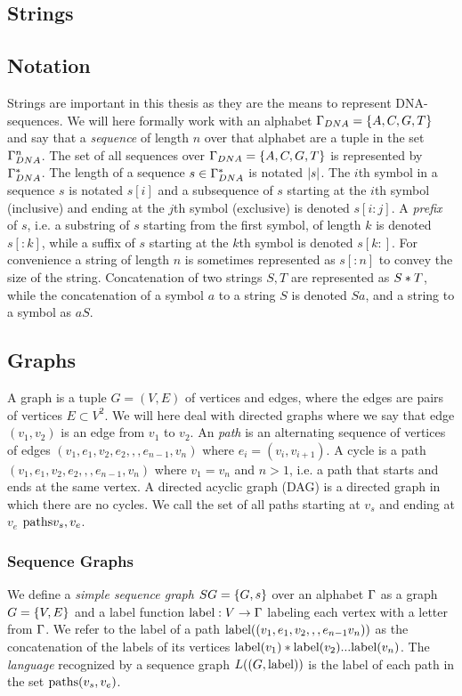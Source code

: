 \subsection{Strings}
\subsection{Notation}
Strings are important in this thesis as they are the means to represent DNA-sequences. We will here formally work with an alphabet $\Gamma_{DNA} = \left\{A, C, G, T\right\}$ and say that a \emph{sequence} of length $n$ over that alphabet are a tuple in the set $\Gamma_{DNA}^n$. The set of all sequences over $\Gamma_{DNA} = \left\{A, C, G, T\right\}$ is  represented by $\Gamma_{DNA}^*$. The length of a sequence $s \in \Gamma_{DNA}^*$ is notated $\left|s\right|$.
The $i$th symbol in a sequence $s$ is notated $s[i]$ and a subsequence of $s$ starting at the $i$th symbol (inclusive) and ending at the $j$th symbol (exclusive) is denoted $s[i:j]$.
A \emph{prefix} of $s$, i.e. a substring of $s$ starting from the first symbol, of length $k$ is denoted $s[:k]$, while a suffix of $s$ starting at the $k$th symbol is denoted $s[k:]$. For convenience a string of length $n$ is sometimes represented as $s[:n]$ to convey the size of the string.
Concatenation of two strings $S, T$ are represented as $S * T$, while the concatenation of a symbol $a$ to a string $S$ is denoted $Sa$, and a string to a symbol as $aS$.

\subsection{Graphs}
A graph is a tuple $G=(V, E)$ of vertices and edges, where the edges are pairs of vertices $E \subset V^2$.
We will here deal with directed graphs where we say that edge $(v_1, v_2)$ is an edge from $v_1$ to $v_2$. An \emph{path} is an alternating sequence of vertices of edges $(v_1, e_1, v_2, e_2,,,e_{n-1}, v_n)$ where $e_i = (v_i, v_{i+1})$.
A cycle is a path $(v_1, e_1, v_2, e_2,,,e_{n-1}, v_n)$ where $v_1=v_n$ and $n>1$, i.e. a path that starts and ends at the same vertex. A directed acyclic graph (DAG) is a directed graph in which there are no cycles.
We call the set of all paths starting at $v_s$ and ending at $v_e$ $\text{paths}{v_s, v_e}$.
\subsubsection{Sequence Graphs}
We define a \emph{simple sequence graph} $SG = \left\{G, s\right\}$ over an alphabet $\Gamma$ as a graph $G=\left\{V, E\right\}$ and a label function $\text{label}: V \rightarrow \Gamma$ labeling each vertex with a letter from $\Gamma$. We refer to the label of a path $\text{label}((v_1, e_1, v_2,,,e_{n-1}v_n))$ as the concatenation of the labels of its vertices $\text{label}(v_1)*\text{label}(v_2) ... \text{label}(v_n)$.
The \emph{language} recognized by a sequence graph $L((G, \text{label}))$ is the label of each path in the set $\text{paths}(v_s, v_e)$. 



